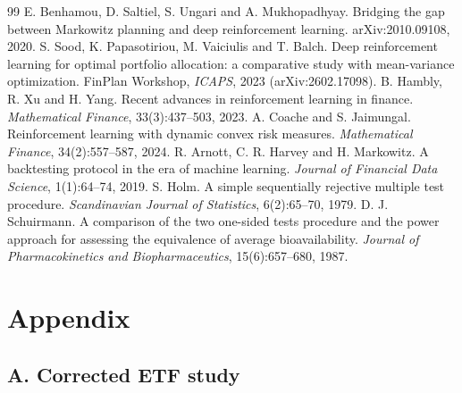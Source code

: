 \documentclass[11pt]{article}
\begin{document}
\begin{thebibliography}{99}
 E. Benhamou, D. Saltiel, S. Ungari and A. Mukhopadhyay. Bridging the gap between Markowitz planning and deep reinforcement learning. arXiv:2010.09108, 2020.
 S. Sood, K. Papasotiriou, M. Vaiciulis and T. Balch. Deep reinforcement learning for optimal portfolio allocation: a comparative study with mean-variance optimization. FinPlan Workshop, \emph{ICAPS}, 2023 (arXiv:2602.17098).
 B. Hambly, R. Xu and H. Yang. Recent advances in reinforcement learning in finance. \emph{Mathematical Finance}, 33(3):437--503, 2023.
 A. Coache and S. Jaimungal. Reinforcement learning with dynamic convex risk measures. \emph{Mathematical Finance}, 34(2):557--587, 2024.
 R. Arnott, C. R. Harvey and H. Markowitz. A backtesting protocol in the era of machine learning. \emph{Journal of Financial Data Science}, 1(1):64--74, 2019.
 S. Holm. A simple sequentially rejective multiple test procedure. \emph{Scandinavian Journal of Statistics}, 6(2):65--70, 1979.
 D. J. Schuirmann. A comparison of the two one-sided tests procedure and the power approach for assessing the equivalence of average bioavailability. \emph{Journal of Pharmacokinetics and Biopharmaceutics}, 15(6):657--680, 1987.
\end{thebibliography}

\appendix
\section*{Appendix}
\subsection{A. Corrected ETF study}\label{a.-corrected-etf-study}
\end{document}
